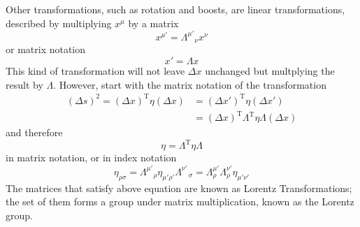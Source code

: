\documentclass[11pt]{article}
\theoremstyle{definition}
\numberwithin{equation}{section}
\begin{document}
Other transformations, such as rotation and boosts, are linear transformations, described by multiplying $x^\mu$ by a matrix
\begin{equation}
    x^{\mu'} = \Lambda^{\mu'}_{\quad\nu} x^\nu
\end{equation}
or matrix notation
\begin{equation}
    x'=\Lambda x
\end{equation}
This kind of transformation will not leave $\Delta x$ unchanged but multplying the result by $\Lambda$. However, start with the matrix notation of the transformation
\begin{equation}
    \begin{aligned}
        (\Delta s)^2 = (\Delta x)^{\text{T}} \eta (\Delta x) &= (\Delta x')^{\text{T}} \eta (\Delta x')\\
        &= (\Delta x)^{\text{T}} \Lambda^{\text{T}} \eta \Lambda (\Delta x)
    \end{aligned}
\end{equation}
and therefore
\begin{equation}
    \eta = \Lambda^{\text{T}} \eta \Lambda
\end{equation}
in matrix notation, or in index notation
\begin{equation}
    \eta_{\rho\sigma} = \Lambda^{\mu'}_{\quad \rho} \eta_{\mu'\rho'}\Lambda^{\nu'}_{\quad \sigma} = \Lambda^{\mu'}_\rho \Lambda^{\nu'}_\rho \eta_{\mu'\nu'}
\end{equation}
The matrices that satisfy above equation are known as Lorentz Transformations; the set of them forms a group under matrix multiplication, known as the Lorentz group.
\end{document}
